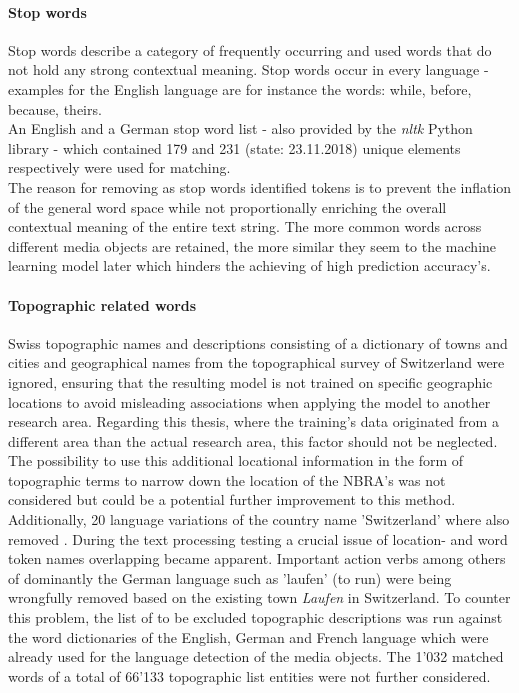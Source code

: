 \paragraph{Stop words}
Stop words describe a category of frequently occurring and used words that do not hold any strong contextual meaning. Stop words occur in every language - examples for the English language are for instance the words: while, before, because, theirs.\\
An English and a German stop word list - also provided by the \textit{nltk} Python library - which contained 179 and 231 (state: 23.11.2018) unique elements respectively were used for matching.\\
\newline
The reason for removing as stop words identified tokens is to prevent the inflation of the general word space while not proportionally enriching the overall contextual meaning of the entire text string. The more common words across different media objects are retained, the more similar they seem to the machine learning model later which hinders the achieving of high prediction accuracy's.

\paragraph{Topographic related words}
Swiss topographic names and descriptions consisting of a dictionary of towns and cities \parencite{Swisstopo2018O} and geographical names from the topographical survey of Switzerland \parencite{Swisstopo2018a} were ignored, ensuring that the resulting model is not trained on  specific geographic locations to avoid misleading associations when applying the model to another research area. Regarding this thesis, where the training's data originated from a different area than the actual research area, this factor should not be neglected. 
The possibility to use this additional locational information in the form of topographic terms to narrow down the location of the NBRA's was not considered but could be a potential further improvement to this method. 
Additionally, 20 language variations of the country name 'Switzerland' where also removed \parencite{101languages2018}. 
During the text processing testing a crucial issue of location- and word token names overlapping became apparent. Important action verbs among others of dominantly the German language such as 'laufen' (to run) were being wrongfully removed based on the existing town \textit{Laufen} in Switzerland. To counter this problem, the list of to be excluded topographic descriptions was run against the word dictionaries of the English, German and French language which were already used for the language detection of the media objects. The 1'032 matched words of a total of 66'133 topographic list entities were not further considered.

